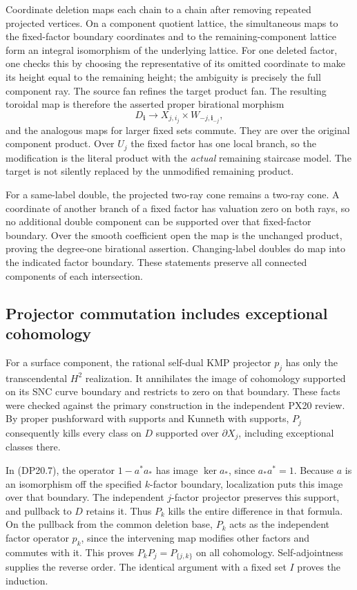 Coordinate deletion maps each chain to a chain after removing
repeated projected vertices. On a component quotient lattice,
the simultaneous maps to the fixed-factor boundary coordinates
and to the remaining-component lattice form an integral
isomorphism of the underlying lattice. For one deleted factor,
one checks this by choosing the representative of its omitted
coordinate to make its height equal to the remaining height;
the ambiguity is precisely the full component ray. The source
fan refines the target product fan. The resulting toroidal map
is therefore the asserted proper birational morphism
\[
 D_{\mathbf i}\longrightarrow
       X_{j,i_j}\times W_{-j,\mathbf i_{-j}},
\]
and the analogous maps for larger fixed sets commute. They are
over the original component product. Over $U_j$ the fixed factor
has one local branch, so the modification is the literal product
with the \emph{actual} remaining staircase model. The target is
not silently replaced by the unmodified remaining product.

For a same-label double, the projected two-ray cone remains a
two-ray cone. A coordinate of another branch of a fixed factor
has valuation zero on both rays, so no additional double component
can be supported over that fixed-factor boundary. Over the smooth
coefficient open the map is the unchanged product, proving the
degree-one birational assertion. Changing-label doubles do map
into the indicated factor boundary. These statements preserve
all connected components of each intersection.

\subsection{Projector commutation includes exceptional cohomology}

For a surface component, the rational self-dual KMP projector
$p_j$ has only the transcendental $H^2$ realization. It annihilates
the image of cohomology supported on its SNC curve boundary and
restricts to zero on that boundary. These facts were checked
against the primary construction in the independent PX20 review.
By proper pushforward with supports and Kunneth with supports,
$P_j$ consequently kills every class on $D$ supported over
$\partial X_j$, including exceptional classes there.

In (DP20.7), the operator $1-a^*a_*$ has image $\ker a_*$,
since $a_*a^*=1$. Because $a$ is an isomorphism off the
specified $k$-factor boundary, localization puts this image over
that boundary. The independent $j$-factor projector preserves
this support, and pullback to $D$ retains it. Thus $P_k$ kills
the entire difference in that formula. On the pullback from the
common deletion base, $P_k$ acts as the independent factor
operator $p_k$, since the intervening map modifies other factors
and commutes with it. This proves $P_kP_j=P_{\{j,k\}}$ on
all cohomology. Self-adjointness supplies the reverse order.
The identical argument with a fixed set $I$ proves the induction.

